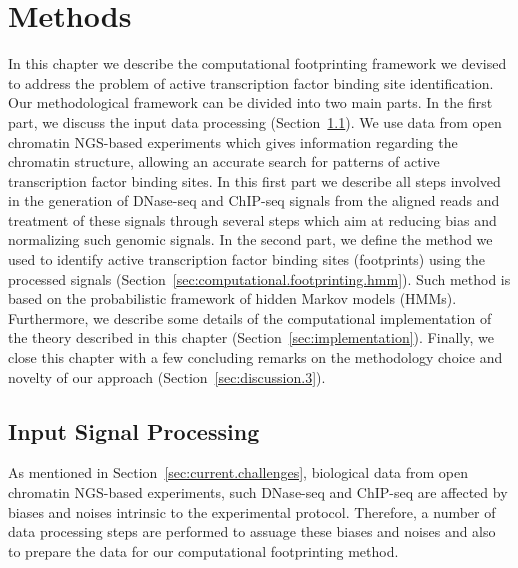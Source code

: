 \chapter{Methods}
\label{cha:methods}

\graphicspath{{chapter3/figs/}}

In this chapter we describe the computational footprinting framework we devised to address the problem of active transcription factor binding site identification. Our methodological framework can be divided into two main parts. In the first part, we discuss the input data processing (Section~\ref{sec:input.signal.processing}). We use data from open chromatin NGS-based experiments which gives information regarding the chromatin structure, allowing an accurate search for patterns of active transcription factor binding sites. In this first part we describe all steps involved in the generation of DNase-seq and ChIP-seq signals from the aligned reads and treatment of these signals through several steps which aim at reducing bias and normalizing such genomic signals. In the second part, we define the method we used to identify active transcription factor binding sites (footprints) using the processed signals (Section~\ref{sec:computational.footprinting.hmm}). Such method is based on the probabilistic framework of hidden Markov models (HMMs). Furthermore, we describe some details of the computational implementation of the theory described in this chapter (Section~\ref{sec:implementation}). Finally, we close this chapter with a few concluding remarks on the methodology choice and novelty of our approach (Section~\ref{sec:discussion.3}).

\section{Input Signal Processing}
\label{sec:input.signal.processing}

As mentioned in Section~\ref{sec:current.challenges}, biological data from open chromatin NGS-based experiments, such DNase-seq and ChIP-seq are affected by biases and noises intrinsic to the experimental protocol. Therefore, a number of data processing steps are performed to assuage these biases and noises and also to prepare the data for our computational footprinting method.

